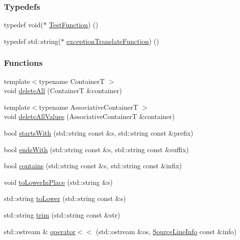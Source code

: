 \subsubsection*{Typedefs}
\begin{DoxyCompactItemize}
\item 
typedef void($\ast$ \hyperlink{a00117_a26414f52d0835939fae52aadd27e6257}{Test\+Function}) ()
\item 
typedef std\+::string($\ast$ \hyperlink{a00117_a14edb319150d3e108bbdef994f9eec2a}{exception\+Translate\+Function}) ()
\end{DoxyCompactItemize}
\subsubsection*{Functions}
\begin{DoxyCompactItemize}
\item 
{\footnotesize template$<$typename Container\+T $>$ }\\void \hyperlink{a00117_aadf9786550a462740ec355f8219863a9}{delete\+All} (Container\+T \&container)
\item 
{\footnotesize template$<$typename Associative\+Container\+T $>$ }\\void \hyperlink{a00117_af2fcec1d4bd984fe19ff8b9a432c36a8}{delete\+All\+Values} (Associative\+Container\+T \&container)
\item 
bool \hyperlink{a00117_a695f62327be0676e046291eeaae15110}{starts\+With} (std\+::string const \&s, std\+::string const \&prefix)
\item 
bool \hyperlink{a00117_ada025504f627feaf9ac68ca391515dff}{ends\+With} (std\+::string const \&s, std\+::string const \&suffix)
\item 
bool \hyperlink{a00117_aa52974b0e426e7e2fbd725a900e9c36e}{contains} (std\+::string const \&s, std\+::string const \&infix)
\item 
void \hyperlink{a00117_a0760dbe87d090a55a35414db57d272c4}{to\+Lower\+In\+Place} (std\+::string \&s)
\item 
std\+::string \hyperlink{a00117_ac036a17412d318598ffda8e1fe7a1177}{to\+Lower} (std\+::string const \&s)
\item 
std\+::string \hyperlink{a00117_a084108b47f37d8bfd5db51c50c7451b3}{trim} (std\+::string const \&str)
\item 
std\+::ostream \& \hyperlink{a00117_a6ec18b5054d7fdfdde861c580b082995}{operator$<$$<$} (std\+::ostream \&os, \hyperlink{a00075}{Source\+Line\+Info} const \&info)
\item 

\end{DoxyCompactItemize}
